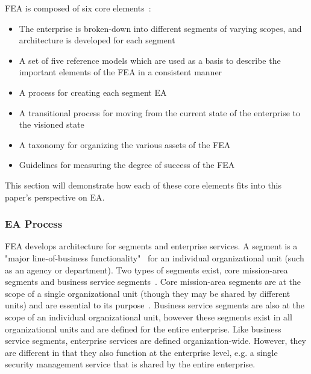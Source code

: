 FEA is composed of six core elements~\cite{sessions2007}:
\begin{itemize}
    \item The enterprise is broken-down into different segments of varying scopes, and architecture is developed for each segment
    \item A set of five reference models which are used as a basis to describe the important elements of the FEA in a consistent manner
    \item A process for creating each segment EA
    \item A transitional process for moving from the current state of the enterprise to the visioned state
    \item A taxonomy for organizing the various assets of the FEA
    \item Guidelines for measuring the degree of success of the FEA
\end{itemize}

This section will demonstrate how each of these core elements fits into this paper's perspective on EA.

\subsubsection{EA Process}


FEA develops architecture for segments and enterprise services. A segment is a "major line-of-business functionality"~\cite{sessions2007} for an individual organizational unit (such as an agency or department). Two types of segments exist, core mission-area segments and business service segments~\cite{FederalEnterpriseArchitectureProgramManagementOffice2007}. Core mission-area segments are at the scope of a single organizational unit (though they may be shared by different units) and are essential to its purpose~\cite{sessions2007,FederalEnterpriseArchitectureProgramManagementOffice2007}. Business service segments are also at the scope of an individual organizational unit, however these segments exist in all organizational units and are defined for the entire enterprise. Like business service segments, enterprise services are defined organization-wide. However, they are different in that they also function at the enterprise level, e.g. a single security management service that is shared by the entire enterprise. 

%
%

